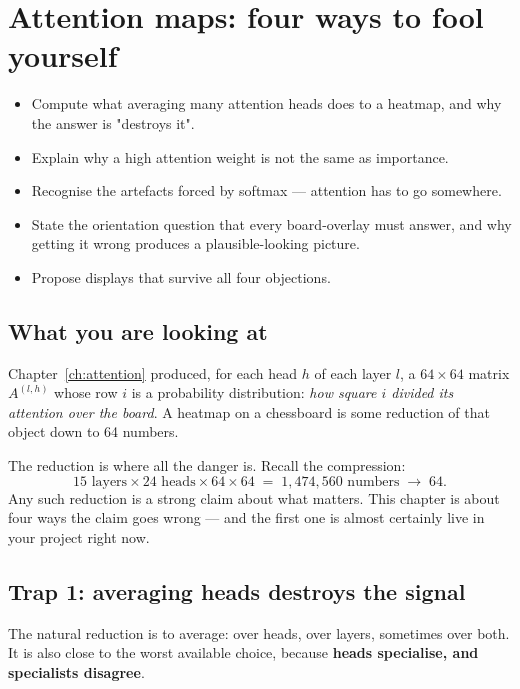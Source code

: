 \chapter{Attention maps: four ways to fool yourself}
\label{ch:attmaps}

\begin{objectives}
\begin{itemize}
\item Compute what averaging many attention heads does to a heatmap, and why the answer is
  "destroys it".
\item Explain why a high attention weight is not the same as importance.
\item Recognise the artefacts forced by softmax --- attention has to go somewhere.
\item State the orientation question that every board-overlay must answer, and why getting it
  wrong produces a plausible-looking picture.
\item Propose displays that survive all four objections.
\end{itemize}
\end{objectives}

\section{What you are looking at}

Chapter~\ref{ch:attention} produced, for each head $h$ of each layer $l$, a $64\times64$
matrix $A^{(l,h)}$ whose row $i$ is a probability distribution: \emph{how square $i$ divided
its attention over the board}. A heatmap on a chessboard is some reduction of that object down
to 64 numbers.

The reduction is where all the danger is. Recall the compression:
\[
  15 \text{ layers} \times 24 \text{ heads} \times 64 \times 64
  \;=\; 1{,}474{,}560 \text{ numbers} \;\longrightarrow\; 64 .
\]
Any such reduction is a strong claim about what matters. This chapter is about four ways the
claim goes wrong --- and the first one is almost certainly live in your project right now.

\section{Trap 1: averaging heads destroys the signal}

The natural reduction is to average: over heads, over layers, sometimes over both. It is also
close to the worst available choice, because \textbf{heads specialise, and specialists
disagree}.

